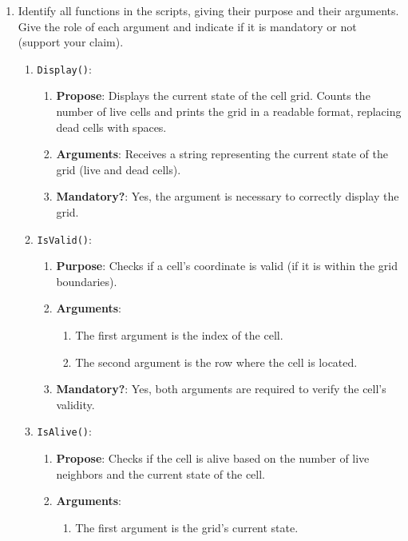 \documentclass[a4paper, 12pt]{article}
\begin{document}
\begin{enumerate}
    \item Identify all functions in the scripts, giving their purpose and their arguments. Give the role of each argument and indicate if it is mandatory or not (support your claim). 
    \begin{enumerate}
        \item \texttt{Display()}:
        \begin{enumerate}
            \item \textbf{Propose}: Displays the current state of the cell grid. Counts the number of live cells and prints the grid in a readable format, replacing dead cells with spaces.
            \item \textbf{Arguments}: Receives a string representing the current state of the grid (live and dead cells).
            \item \textbf{Mandatory?}: Yes, the argument is necessary to correctly display the grid.
        \end{enumerate}
        \item \texttt{IsValid()}:
        \begin{enumerate}
            \item \textbf{Purpose}: Checks if a cell’s coordinate is valid (if it is within the grid boundaries).
            \item \textbf{Arguments}:
            \begin{enumerate}[label=\alph*.]
                \item The first argument is the index of the cell.
                \item The second argument is the row where the cell is located.
            \end{enumerate}
            \item \textbf{Mandatory?}: Yes, both arguments are required to verify the cell’s validity.
        \end{enumerate}
        \item \texttt{IsAlive()}:
        \begin{enumerate}
            \item \textbf{Propose}: Checks if the cell is alive based on the number of live neighbors and the current state of the cell.
            \item \textbf{Arguments}:
            \begin{enumerate}[label=\alph*.]
                \item The first argument is the grid’s current state.

\end{enumerate}
\end{enumerate}
\end{enumerate}
\end{enumerate}
\end{document}
